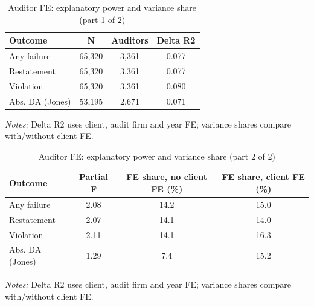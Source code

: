 \begin{table}[htbp]
\footnotesize
\centering
\caption{Auditor FE: explanatory power and variance share (part 1 of 2)}
\begin{threeparttable}
\begin{tabular}{p{}ccc}
\toprule
Outcome & N & Auditors & Delta R2 \\
\midrule
Any failure & 65,320 & 3,361 & 0.077 \\
Restatement & 65,320 & 3,361 & 0.077 \\
Violation & 65,320 & 3,361 & 0.080 \\
Abs. DA (Jones) & 53,195 & 2,671 & 0.071 \\
\bottomrule
\end{tabular}
\begin{tablenotes}\footnotesize
\item \raggedright \textit{Notes:} Delta R2 uses client, audit firm and year FE; variance shares compare with/without client FE.
\end{tablenotes}
\end{threeparttable}
\end{table}

\begin{table}[htbp]
\footnotesize
\centering
\caption{Auditor FE: explanatory power and variance share (part 2 of 2)}
\begin{threeparttable}
\begin{tabular}{p{}ccc}
\toprule
Outcome & Partial F & FE share, no client FE (\%) & FE share, client FE (\%) \\
\midrule
Any failure & 2.08 & 14.2 & 15.0 \\
Restatement & 2.07 & 14.1 & 14.0 \\
Violation & 2.11 & 14.1 & 16.3 \\
Abs. DA (Jones) & 1.29 & 7.4 & 15.2 \\
\bottomrule
\end{tabular}
\begin{tablenotes}\footnotesize
\item \raggedright \textit{Notes:} Delta R2 uses client, audit firm and year FE; variance shares compare with/without client FE.
\end{tablenotes}
\end{threeparttable}
\end{table}
